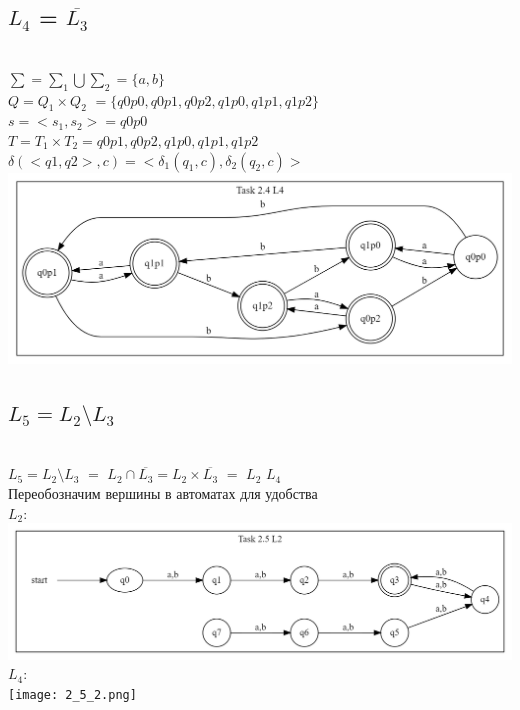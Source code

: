 \documentclass{article}
\begin{document}
\subsection {$L_4$ = $\overline{L_3}$}\\
$\sum = \sum_1 \bigcup \sum_2 = \{a, b\}$\\
$Q = Q_1 \times Q_2$ $= \{q0p0, q0p1, q0p2, q1p0, q1p1, q1p2 \}$\\
$s = <s_1, s_2> = q0p0$\\
$T = T_1 \times T_2 = q0p1, q0p2, q1p0, q1p1, q1p2 $\\
$ \delta(<q1, q2>, c) = <\delta_1(q_1, c), \delta_2(q_2, c)>$\\ 
\newline\includegraphics[scale=0.25]{2_4.png}


\subsection{$L_5 = L_2 \setminus L_3 $}\\
$L_5 = L_2 \setminus L_3 $ $=$ $L_2 \cap \overline{L_3} = L_2 \times  \overline{L_3}$  $=$ $L_2$ \times $L_4$\\
Переобозначим вершины в автоматах для удобства
\\$L_2$:\\
\newline\includegraphics[scale=0.25]{2_5_1.png}
\\$L_4$:\\
\newline\texttt{[image: 2\_5\_2.png]}
\end{document}

